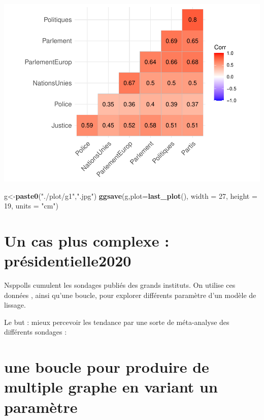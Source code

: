 \documentclass[
]{book}
\newenvironment{Shaded}{\begin{snugshade}}{\end{snugshade}}
\newcommand{\DataTypeTok}[1]{\textcolor[rgb]{0.13,0.29,0.53}{#1}}
\newcommand{\DecValTok}[1]{\textcolor[rgb]{0.00,0.00,0.81}{#1}}
\newcommand{\KeywordTok}[1]{\textcolor[rgb]{0.13,0.29,0.53}{\textbf{#1}}}
\newcommand{\NormalTok}[1]{#1}
\newcommand{\StringTok}[1]{\textcolor[rgb]{0.31,0.60,0.02}{#1}}
\begin{document}
\includegraphics{bookdown-demo_files/figure-latex/0505-1.pdf}

\begin{Shaded}
\begin{Highlighting}[]
\NormalTok{g<-}\KeywordTok{paste0}\NormalTok{(}\StringTok{"./plot/g1"}\NormalTok{,}\StringTok{".jpg"}\NormalTok{)}
\KeywordTok{ggsave}\NormalTok{(g,}\DataTypeTok{plot=}\KeywordTok{last_plot}\NormalTok{(), }\DataTypeTok{width =} \DecValTok{27}\NormalTok{, }\DataTypeTok{height =} \DecValTok{19}\NormalTok{, }\DataTypeTok{units =} \StringTok{"cm"}\NormalTok{)}
\end{Highlighting}
\end{Shaded}

\hypertarget{un-cas-plus-complexe-pruxe9sidentielle2020}{%
\section{Un cas plus complexe : présidentielle2020}\label{un-cas-plus-complexe-pruxe9sidentielle2020}}

Nsppolls cumulent les sondages publiés des grands instituts. On utilise ces données , ainsi qu'une boucle, pour explorer différents paramètre d'un modèle de lissage.

Le but : mieux percevoir les tendance par une sorte de méta-analyse des différents sondages :

\hypertarget{une-boucle-pour-produire-de-multiple-graphe-en-variant-un-paramuxe8tre}{%
\section{une boucle pour produire de multiple graphe en variant un paramètre}\label{une-boucle-pour-produire-de-multiple-graphe-en-variant-un-paramuxe8tre}}
\end{document}
